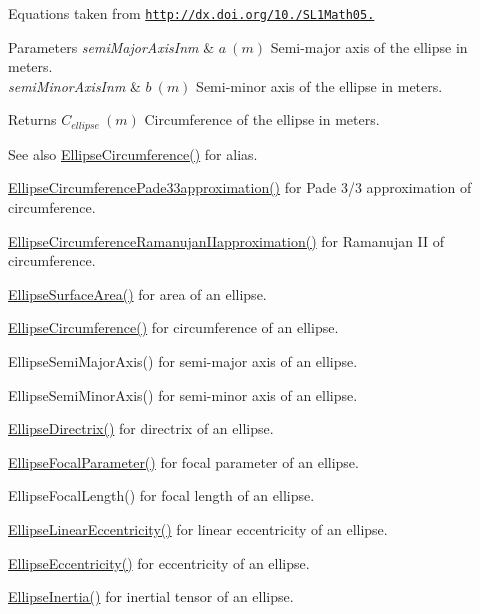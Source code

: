 Equations taken from \href{http://dx.doi.org/10.3247/SL1Math05.004}{\tt http\+://dx.\+doi.\+org/10./\+S\+L1\+Math05.} 
\begin{DoxyParams}{Parameters}
{\em semi\+Major\+Axis\+Inm} & $ a\ (m)$ Semi-\/major axis of the ellipse in meters. \\
\hline
{\em semi\+Minor\+Axis\+Inm} & $ b\ (m)$ Semi-\/minor axis of the ellipse in meters. \\
\hline
\end{DoxyParams}
\begin{DoxyReturn}{Returns}
$ C_{ellipse}\ (m)$ Circumference of the ellipse in meters. 
\end{DoxyReturn}
\begin{DoxySeeAlso}{See also}
\mbox{\hyperlink{group___e_g_x_math-_geometry-2_d-_ellipse-_circumference_ga4172802ac674eb53467b44928ac635c7}{Ellipse\+Circumference()}} for alias. 

\mbox{\hyperlink{group___e_g_x_math-_geometry-2_d-_ellipse-_circumference_ga0e0b290f1da2605c16ec13b9e221769d}{Ellipse\+Circumference\+Pade33approximation()}} for Pade 3/3 approximation of circumference. 

\mbox{\hyperlink{group___e_g_x_math-_geometry-2_d-_ellipse-_circumference_gaa908406db81fadc7c2d73e4e113d24d7}{Ellipse\+Circumference\+Ramanujan\+I\+Iapproximation()}} for Ramanujan II of circumference. 

\mbox{\hyperlink{group___e_g_x_math-_geometry-2_d-_ellipse-_surface_area_ga4ce8c8323e9718ce5458f4ab7f6d823d}{Ellipse\+Surface\+Area()}} for area of an ellipse. 

\mbox{\hyperlink{group___e_g_x_math-_geometry-2_d-_ellipse-_circumference_ga4172802ac674eb53467b44928ac635c7}{Ellipse\+Circumference()}} for circumference of an ellipse. 

Ellipse\+Semi\+Major\+Axis() for semi-\/major axis of an ellipse. 

Ellipse\+Semi\+Minor\+Axis() for semi-\/minor axis of an ellipse. 

\mbox{\hyperlink{group___e_g_x_math-_geometry-2_d-_ellipse-_directrix_gace8f72a8efbc9c18d3eb689151405106}{Ellipse\+Directrix()}} for directrix of an ellipse. 

\mbox{\hyperlink{group___e_g_x_math-_geometry-2_d-_ellipse-_focal_parameter_ga4cd01a38c72c092ef9791351948bf69b}{Ellipse\+Focal\+Parameter()}} for focal parameter of an ellipse. 

Ellipse\+Focal\+Length() for focal length of an ellipse. 

\mbox{\hyperlink{group___e_g_x_math-_geometry-2_d-_ellipse-_linear_eccentricity_gac70b3010e30aa8b73deb50fe2b9b9a91}{Ellipse\+Linear\+Eccentricity()}} for linear eccentricity of an ellipse. 

\mbox{\hyperlink{group___e_g_x_math-_geometry-2_d-_ellipse-_eccentricity_ga6a0a7fba17f782616894cfc447628c33}{Ellipse\+Eccentricity()}} for eccentricity of an ellipse. 

\mbox{\hyperlink{group___e_g_x_math-_geometry-2_d-_ellipse-_inertia_ga10a3049c2f04b50f271fb01dc62e4cf8}{Ellipse\+Inertia()}} for inertial tensor of an ellipse. 
\end{DoxySeeAlso}
